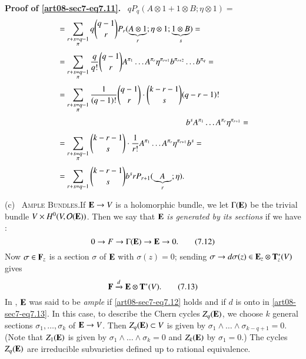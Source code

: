 \noindent
{\bf Proof of \eqref{art08-sec7-eq7.11}.}~ $qP_{q}(A\otimes 1+1\otimes B;\eta\otimes 1)=$
\begin{align*}
&= \sum\limits_{\substack{r+s=q-1\\ \pi}}q\binom{q-1}{r}P_{r}(\underbrace{A\otimes 1}_{r};\eta\otimes 1; \underbrace{1\otimes B}_{s})=\\[3pt]
&= \sum\limits_{\substack{r+s=q-1\\ \pi}}\dfrac{q}{q!}\binom{q-1}{r}A^{\pi_{1}}\ldots A^{\pi_{r}}\eta^{\pi_{r+1}}b^{\pi_{r+2}}\ldots b^{\pi_{q}}=\\[3pt]
&= \sum\limits_{\substack{r+s=q-1\\ \pi}}\dfrac{1}{(q-1)!}\binom{q-1}{r}\cdot \binom{k-r-1}{s}(q-r-1)!\\[3pt]
&\hspace{5.5cm} b^{s}A^{\pi_{1}}\ldots A^{\pi_{r}}\eta^{\pi_{r+1}}=\\[3pt]
&= \sum\limits_{\substack{r+s=q-1\\ \pi}}\binom{k-r-1}{s}\cdot \dfrac{1}{r!}A^{\pi_{1}}\ldots A^{\pi_{r}}\eta^{\pi_{r+1}}b^{s}=\\[3pt]
&= \sum\limits_{r+s=q-1}\binom{k-r-1}{s}b^{s}rP_{r+1}(\underbrace{A}_{r};\eta).
\end{align*}

(c)~ \textsc{Ample Bundles.}\pageoriginale If $\mathbf{E}\to V$ is a holomorphic bundle, we let $\Gamma(\mathbf{E})$ be the trivial bundle $V\times H^{0}(V,\mathcal{O}(\mathbf{E}))$. Then we say that $\mathbf{E}$ {\em is generated by its sections} if we have :
\begin{equation*}
0\to F\to \Gamma(\mathbf{E})\to \mathbf{E}\to 0.\tag{7.12}\label{art08-sec7-eq7.12}
\end{equation*}
Now $\sigma\in \mathbf{F}_{z}$ is a section $\sigma$ of $\mathbf{E}$ with $\sigma(z)=0$; sending $\sigma\to d\sigma(z)\in \mathbf{E}_{z}\otimes \mathbf{T}^{*}_{z}(V)$ gives
\begin{equation*}
\mathbf{F}\xrightarrow{d}\mathbf{E}\otimes \mathbf{T}^{*}(V).\tag{7.13}\label{art08-sec7-eq7.13}
\end{equation*}
In \cite{art08-key11}, $\mathbf{E}$ was said to be {\em ample} if \eqref{art08-sec7-eq7.12} holds and if $d$ is onto in \eqref{art08-sec7-eq7.13}. In this case, to describe the Chern cycles $Z_{q}(\mathbf{E})$, we choose $k$ general sections $\sigma_{1},\ldots,\sigma_{k}$ of $\mathbf{E}\to V$. Then $Z_{q}(\mathbf{E})\subset V$ is given by $\sigma_{1}\wedge\ldots\wedge \sigma_{k-q+1}=0$. (Note that $Z_{1}(\mathbf{E})$ is given by $\sigma_{1}\wedge\ldots\wedge \sigma_{k}=0$ and $Z_{k}(\mathbf{E})$ by $\sigma_{1}=0$.) The cycles $Z_{q}(\mathbf{E})$ are irreducible subvarieties defined up to rational equivalence.


